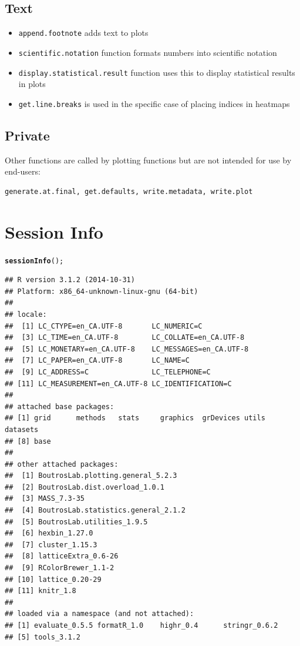 \documentclass[letterpaper]{article}\usepackage[]{graphicx}\usepackage[]{color}
\makeatletter
\newcommand{\hlstd}[1]{\textcolor[rgb]{0.345,0.345,0.345}{#1}}%
\newcommand{\hlkwd}[1]{\textcolor[rgb]{0.737,0.353,0.396}{\textbf{#1}}}%
\newenvironment{kframe}{%
 \def\at@end@of@kframe{}%
 \ifinner\ifhmode%
  \def\at@end@of@kframe{\end{minipage}}%
  \begin{minipage}{\columnwidth}%
 \fi\fi%
 \def\FrameCommand##1{\hskip\@totalleftmargin \hskip-\fboxsep
 \colorbox{shadecolor}{##1}\hskip-\fboxsep
     \hskip-\linewidth \hskip-\@totalleftmargin \hskip\columnwidth}%
 \MakeFramed {\advance\hsize-\width
   \@totalleftmargin\z@ \linewidth\hsize
   \@setminipage}}%
 {\par\unskip\endMakeFramed%
 \at@end@of@kframe}
\newenvironment{knitrout}{}{} %
\makeatother
\begin{document}
\subsection{Text}
\begin{itemize}
\item \texttt{append.footnote} adds text to plots
\item \texttt{scientific.notation} function formats numbers into scientific notation
\item \texttt{display.statistical.result} function uses this to display statistical results in plots
\item \texttt{get.line.breaks} is used in the specific case of placing indices in heatmaps
\end{itemize}

\subsection{Private}
Other functions are called by plotting functions but are not intended for use by end-users: 
\begin{verbatim}
generate.at.final, get.defaults, write.metadata, write.plot
\end{verbatim}



\section{Session Info}
\begin{knitrout}
\color{fgcolor}\begin{kframe}
\begin{alltt}
\hlkwd{sessionInfo}\hlstd{();}
\end{alltt}
\begin{verbatim}
## R version 3.1.2 (2014-10-31)
## Platform: x86_64-unknown-linux-gnu (64-bit)
## 
## locale:
##  [1] LC_CTYPE=en_CA.UTF-8       LC_NUMERIC=C              
##  [3] LC_TIME=en_CA.UTF-8        LC_COLLATE=en_CA.UTF-8    
##  [5] LC_MONETARY=en_CA.UTF-8    LC_MESSAGES=en_CA.UTF-8   
##  [7] LC_PAPER=en_CA.UTF-8       LC_NAME=C                 
##  [9] LC_ADDRESS=C               LC_TELEPHONE=C            
## [11] LC_MEASUREMENT=en_CA.UTF-8 LC_IDENTIFICATION=C       
## 
## attached base packages:
## [1] grid      methods   stats     graphics  grDevices utils     datasets 
## [8] base     
## 
## other attached packages:
##  [1] BoutrosLab.plotting.general_5.2.3  
##  [2] BoutrosLab.dist.overload_1.0.1     
##  [3] MASS_7.3-35                        
##  [4] BoutrosLab.statistics.general_2.1.2
##  [5] BoutrosLab.utilities_1.9.5         
##  [6] hexbin_1.27.0                      
##  [7] cluster_1.15.3                     
##  [8] latticeExtra_0.6-26                
##  [9] RColorBrewer_1.1-2                 
## [10] lattice_0.20-29                    
## [11] knitr_1.8                          
## 
## loaded via a namespace (and not attached):
## [1] evaluate_0.5.5 formatR_1.0    highr_0.4      stringr_0.6.2 
## [5] tools_3.1.2
\end{verbatim}
\end{kframe}
\end{knitrout}
\end{document}
